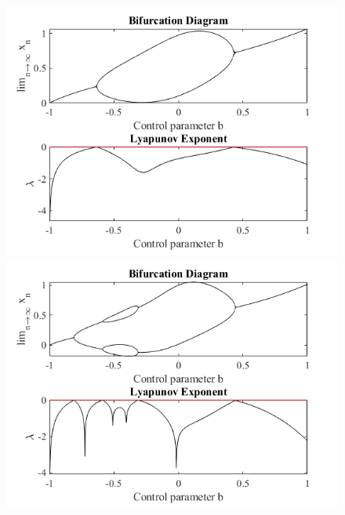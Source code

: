 \documentclass[a4paper,12pt,notitlepage]{article}
\begin{document}
\begin{figure}[h]
    \centering

        \centering
        \includegraphics[width=\textwidth]{a=2.png} 

        \centering
        \includegraphics[width=\textwidth]{a=4.png} 
\end{figure}
\end{document}

